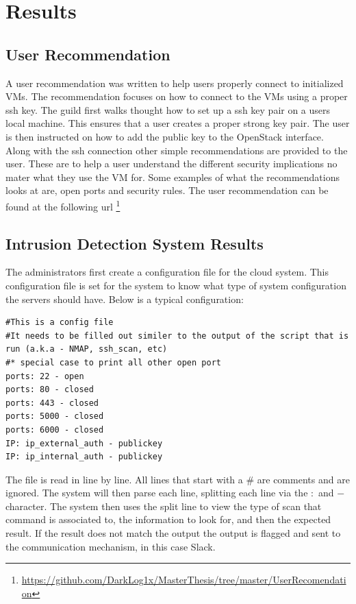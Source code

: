 \documentclass[12pt]{article}
\begin{document}
\section{Results}

\subsection{User Recommendation}
A user recommendation was written to help users properly connect to initialized VMs. The recommendation focuses on how to connect to the VMs using a proper ssh key. The guild first walks thought how to set up a ssh key pair on a users local machine. This ensures that a user creates a proper strong key pair. The user is then instructed on how to add the public key to the OpenStack interface. Along with the ssh connection other simple recommendations are provided to the user. These are to help a user understand the different security implications no mater what they use the VM for. Some examples of what the recommendations looks at are, open ports and security rules. The user recommendation can be found at the following url \footnote{\href{https://github.com/DarkLog1x/MasterThesis/tree/master/UserRecomendation}{https://github.com/DarkLog1x/MasterThesis/tree/master/UserRecomendation}}

\subsection{Intrusion Detection System Results}
The administrators first create a configuration file for the cloud system. This configuration file is set for the system to know what type of system configuration the servers should have. Below is a typical configuration:

\begin{mdframed}
    \begin{lstlisting}
#This is a config file
#It needs to be filled out similer to the output of the script that is run (a.k.a - NMAP, ssh_scan, etc)
#* special case to print all other open port
ports: 22 - open
ports: 80 - closed
ports: 443 - closed
ports: 5000 - closed
ports: 6000 - closed
IP: ip_external_auth - publickey
IP: ip_internal_auth - publickey
    \end{lstlisting}
\end{mdframed}
The file is read in line by line. All lines that start with a \# are comments and are ignored. The system will then parse each line, splitting each line via the $:$ and $-$ character. The system then uses the split line to view the type of scan that command is associated to, the information to look for, and then the expected result. If the result does not match the output the output is flagged and sent to the communication mechanism, in this case Slack.
\end{document}

